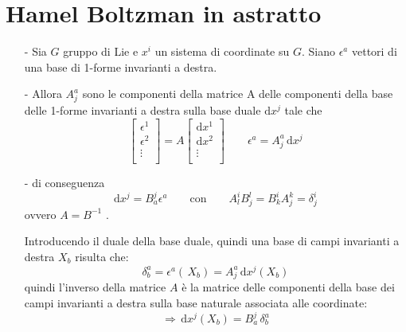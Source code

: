 \chapter{Hamel Boltzman in astratto}
\begin{itemize}

\item[-] Sia $G$ gruppo di Lie e $x^{i}$ un sistema di coordinate su $G$.
Siano $ \epsilon^{a}$ vettori di una base di 1-forme invarianti a destra.

\item[-]Allora $A^{a}_{j}$ sono le componenti della matrice A delle componenti della base delle 1-forme invarianti a destra sulla base duale $\textrm{d}x^{j}$ tale che
\begin{displaymath}
\left[ \begin{array}{c} \epsilon ^{1} \\ \epsilon ^{2} \\ \vdots \\ \end{array} \right]
 = A \left[ \begin{array}{c} \textrm{d} x^{1} \\ \textrm{d} x^{2} \\ \vdots \\ \end{array} \right] \qquad \epsilon^{a} = A^{a}_{j} \, \textrm{d}x^{j}
\end{displaymath} 

\item[-]di conseguenza
\begin{equation}\label{basedualespuntata}
\textrm{d} x^{j} = B^{j}_{a} \epsilon^{a} \qquad \textrm{con} \qquad A^{i}_{l}B^{l}_{j} = B^{i}_{k} A^{k}_{j} = \delta ^{i}_{j}
\end{equation}
ovvero $A = B^{-1}$ .

Introducendo il duale della base duale, quindi una base di campi invarianti a destra $X_{b}$ risulta che:
\begin{displaymath}
\delta^{a}_{b} = \epsilon^{a}(\,X_{b}) = A^{a}_{j}\, \textrm{d}x^{j}(X_{b})
\end{displaymath}
quindi l'inverso della matrice $A$ è la matrice delle componenti della base dei campi invarianti a destra sulla base naturale associata alle coordinate:
\begin{displaymath}
\Rightarrow \, \textrm{d}x^{j}(X_{b}) = B^{j}_{a} \, \delta^{a}_{b}
\end{displaymath}


\end{itemize}
